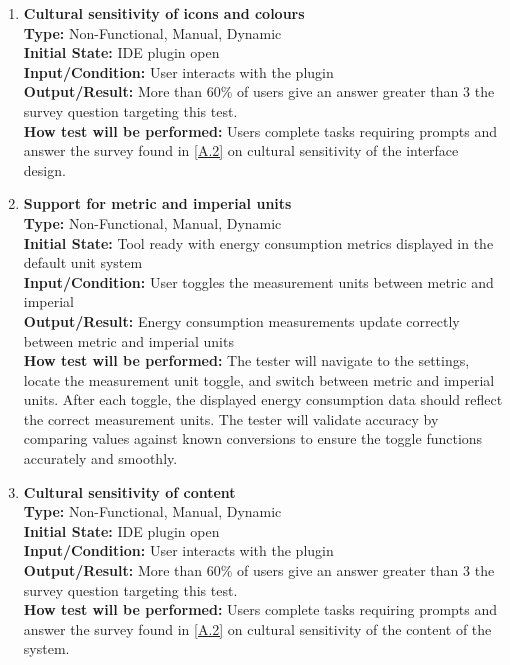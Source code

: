\documentclass[12pt, titlepage]{article}
\begin{document}
\begin{enumerate}[label={\bf \textcolor{Maroon}{test-CULT-\arabic*}}, wide=0pt, font=\itshape]
  \item \textbf{Cultural sensitivity of icons and colours} \\[2mm]
    \textbf{Type:} Non-Functional, Manual, Dynamic \\
    \textbf{Initial State:} IDE plugin open \\
    \textbf{Input/Condition:} User interacts with the plugin \\
    \textbf{Output/Result:} More than 60\% of users give an answer greater than 3 the survey question targeting this test. \\[2mm]
    \textbf{How test will be performed:} Users complete tasks requiring prompts and answer the survey found in \ref{A.2} on cultural sensitivity of the interface design.

  \item \textbf{Support for metric and imperial units} \\[2mm]
    \textbf{Type:} Non-Functional, Manual, Dynamic \\
    \textbf{Initial State:} Tool ready with energy consumption metrics displayed in the default unit system \\
    \textbf{Input/Condition:} User toggles the measurement units between metric and imperial \\
    \textbf{Output/Result:} Energy consumption measurements update correctly between metric and imperial units \\[2mm]
    \textbf{How test will be performed:} The tester will navigate to the settings, locate the measurement unit toggle, and switch between metric and imperial units. After each toggle, the displayed energy consumption data should reflect the correct measurement units. The tester will validate accuracy by comparing values against known conversions to ensure the toggle functions accurately and smoothly.

  \item \textbf{Cultural sensitivity of content} \\[2mm]
    \textbf{Type:} Non-Functional, Manual, Dynamic \\
    \textbf{Initial State:} IDE plugin open \\
    \textbf{Input/Condition:} User interacts with the plugin \\
    \textbf{Output/Result:} More than 60\% of users give an answer greater than 3 the survey question targeting this test. \\[2mm]
    \textbf{How test will be performed:} Users complete tasks requiring prompts and answer the survey found in \ref{A.2} on cultural sensitivity of the content of the system.
\end{enumerate}
\end{document}

